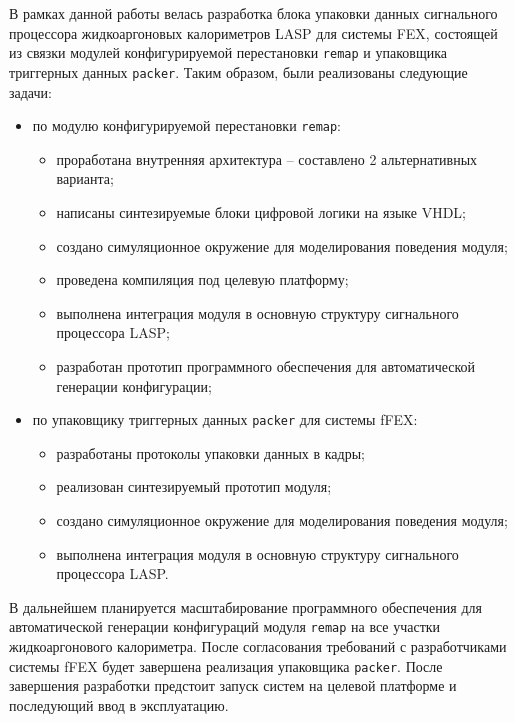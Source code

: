 В рамках данной работы велась разработка блока упаковки данных сигнального процессора жидкоаргоновых калориметров LASP для системы FEX, состоящей из связки модулей конфигурируемой перестановки \texttt{remap} и упаковщика триггерных данных \texttt{packer}. Таким образом, были реализованы следующие задачи:\par
\begin{itemize}
    \item по модулю конфигурируемой перестановки \texttt{remap}:
        \begin{itemize}
            \item проработана внутренняя архитектура -- составлено 2 альтернативных варианта;
            \item написаны синтезируемые блоки цифровой логики на языке VHDL;
            \item создано симуляционное окружение для моделирования поведения модуля;
            \item проведена компиляция под целевую платформу;
            \item выполнена интеграция модуля в основную структуру сигнального процессора LASP;
            \item разработан прототип программного обеспечения для автоматической генерации конфигурации;
        \end{itemize}
    \item по упаковщику триггерных данных \texttt{packer} для системы fFEX:
        \begin{itemize}
            \item разработаны протоколы упаковки данных в кадры;
            \item реализован синтезируемый прототип модуля;
            \item создано симуляционное окружение для моделирования поведения модуля;
            \item выполнена интеграция модуля в основную структуру сигнального процессора LASP.
        \end{itemize}
\end{itemize}\par
В дальнейшем планируется масштабирование программного обеспечения для автоматической генерации конфигураций модуля \texttt{remap} на все участки жидкоаргонового калориметра. После согласования требований с разработчиками системы fFEX будет завершена реализация упаковщика \texttt{packer}. После завершения разработки предстоит запуск систем на целевой платформе и последующий ввод в эксплуатацию.\par
